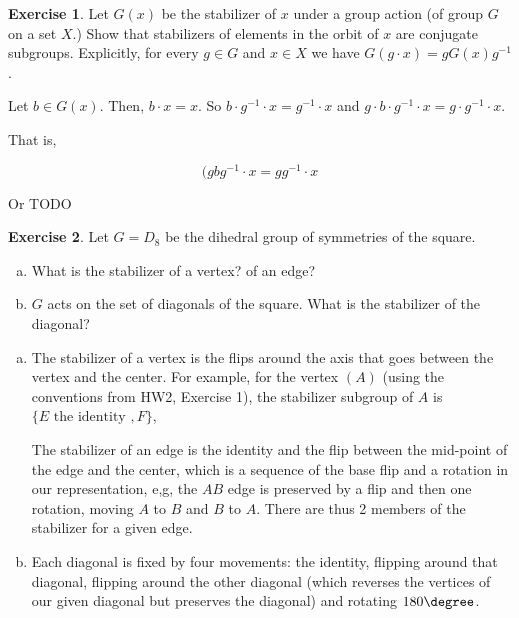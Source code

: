 \documentclass[11pt,oneside]{article}
\numberwithin{equation}{section}
\theoremstyle{definition}
\newtheorem{exercise}{Exercise}
\begin{document}
\begin{exercise}
  Let $G(x)$ be the stabilizer of $x$ under a group action (of group $G$ on a set $X$.) Show
  that stabilizers of elements in the orbit of $x$ are conjugate subgroups. Explicitly, for
  every $g \in G$ and $x \in X$ we have $G(g \cdot x) = gG(x)g^{-1}$.
\end{exercise}
\begin{solution}
  Let $b \in G(x)$.  Then, $ b \cdot x = x$.  So $ b \cdot g^{-1} \cdot x = g^{-1} \cdot x$
  and $g \cdot b \cdot g ^ { -1} \cdot x = g \cdot g ^ { -1 } \cdot x$.

  That is,

  \[
  (gbg^{-1} \cdot x = g g^{-1} \cdot x
  \]

  Or TODO
  
\end{solution}

\begin{exercise}
  Let $G = D_8$ be the dihedral group of symmetries of the square.
  \begin{enumerate}[(a)]
    \item 
      What is the stabilizer of a vertex?  of an edge?
    \item
      $G$ acts on the set of diagonals of the square.  What is the stabilizer of the diagonal?
  \end{enumerate}
\end{exercise}
\begin{solution}
  \begin{enumerate}[(a)]
    \item 
      The stabilizer of a vertex is the flips around the axis that
      goes between the vertex and the center.  For example, for the
      vertex $(A)$ (using the conventions from HW2, Exercise 1), the
      stabilizer subgroup of $A$ is $\{E \textrm{ the identity }, F \}$,

      The stabilizer of an edge is the identity and the flip between
      the mid-point of the edge and the center, which is a sequence of
      the base flip and a rotation in our representation, e,g, the
      $AB$ edge is preserved by a flip and then one rotation, moving
      $A$ to $B$ and $B$ to $A$.  There are thus 2 members of the
      stabilizer for a given edge.
    \item
      Each diagonal is fixed by four movements: the identity, flipping
      around that diagonal, flipping around the other diagonal (which
      reverses the vertices of our given diagonal but preserves the
      diagonal) and rotating $180\degree$.  
  \end{enumerate}
  
\end{solution}
\end{document}
